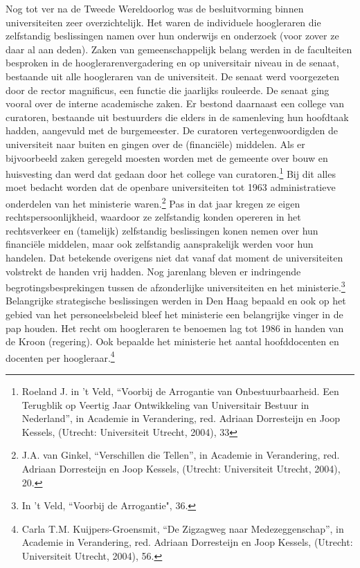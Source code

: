 \documentclass{jote-book}
\begin{document}
	Nog tot ver na de Tweede Wereldoorlog was de besluitvorming binnen universiteiten zeer overzichtelijk. Het waren de individuele hoogleraren die zelfstandig beslissingen namen over hun onderwijs en onderzoek (voor zover ze daar al aan deden). Zaken van gemeenschappelijk belang werden in de faculteiten besproken in de hooglerarenvergadering en op universitair niveau in de senaat, bestaande uit alle hoogleraren van de universiteit. De senaat werd voorgezeten door de rector magnificus, een functie die jaarlijks rouleerde. De senaat ging vooral over de interne academische zaken. Er bestond daarnaast een college van curatoren, bestaande uit bestuurders die elders in de samenleving hun hoofdtaak hadden, aangevuld met de burgemeester. De curatoren vertegenwoordigden de universiteit naar buiten en gingen over de (financiële) middelen. Als er bijvoorbeeld zaken geregeld moesten worden met de gemeente over bouw en huisvesting dan werd dat gedaan door het college van curatoren.\footnote{Roeland J. in 't Veld, “Voorbij de Arrogantie van Onbestuurbaarheid. Een Terugblik op Veertig Jaar Ontwikkeling van Universitair Bestuur in Nederland”, in Academie in Verandering, red. Adriaan Dorresteijn en Joop Kessels, (Utrecht: Universiteit Utrecht, 2004), 33} Bij dit alles moet bedacht worden dat de openbare universiteiten tot 1963 administratieve onderdelen van het ministerie waren.\footnote{J.A. van Ginkel, “Verschillen die Tellen”, in Academie in Verandering, red. Adriaan Dorresteijn en Joop Kessels, (Utrecht: Universiteit Utrecht, 2004), 20.} Pas in dat jaar kregen ze eigen rechtspersoonlijkheid, waardoor ze zelfstandig konden opereren in het rechtsverkeer en (tamelijk) zelfstandig beslissingen konen nemen over hun financiële middelen, maar ook zelfstandig aansprakelijk werden voor hun handelen. Dat betekende overigens niet dat vanaf dat moment de universiteiten volstrekt de handen vrij hadden. Nog jarenlang bleven er indringende begrotingsbesprekingen tussen de afzonderlijke universiteiten en het ministerie.\footnote{In 't Veld, “Voorbij de Arrogantie", 36.} Belangrijke strategische beslissingen werden in Den Haag bepaald en ook op het gebied van het personeelsbeleid bleef het ministerie een belangrijke vinger in de pap houden. Het recht om hoogleraren te benoemen lag tot 1986 in handen van de Kroon (regering). Ook bepaalde het ministerie het aantal hoofddocenten en docenten per hoogleraar.\footnote{Carla T.M. Kuijpers-Groensmit, “De Zigzagweg naar Medezeggenschap”, in Academie in Verandering, red. Adriaan Dorresteijn en Joop Kessels, (Utrecht: Universiteit Utrecht, 2004), 56.}
\end{document}
